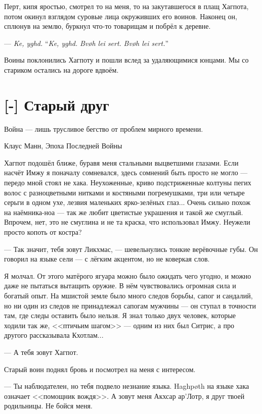 Перт, кипя яростью, смотрел то на меня, то на закутавшегося в плащ Хагпота, потом окинул взглядом суровые лица окруживших его воинов.
Наконец он, сплюнув на землю, буркнул что-то товарищам и побрёл к деревне.

{--- \textit{Ke, yghd.}}
{``\textit{Ke, yghd.}}
{\textit{Bv\o{}h lei sert.}}
{\textit{Bv\o h lei sert.}''}

Воины поклонились Хагпоту и пошли вслед за удаляющимися юнцами.
Мы со стариком остались на дороге вдвоём.

\section{[-] Старый друг}

\epigraph
{Война --- лишь трусливое бегство от проблем мирного времени.}
{Клаус Манн, Эпоха Последней Войны}

Хагпот подошёл ближе, буравя меня стальными выцветшими глазами.
Если насчёт Имжу я поначалу сомневался, здесь сомнений быть просто не могло --- передо мной стоял не хака.
Неухоженные, криво подстриженные колтуны пегих волос с разноцветными нитками и костяными погремушками, три или четыре серьги в одном ухе, лезвия маленьких ярко-зелёных глаз...
Очень сильно похож на наёмника-ноа --- так же любит цветистые украшения и такой же смуглый.
Впрочем, нет, это не смуглина и не та краска, что использовал Имжу.
Неужели просто копоть от костра?

--- Так значит, тебя зовут Ликхмас, --- шевельнулись тонкие верёвочные губы.
Он говорил на языке сели --- с лёгким акцентом, но не коверкая слов.

Я молчал.
От этого матёрого ягуара можно было ожидать чего угодно, и можно даже не пытаться вытащить оружие.
В нём чувствовались огромная сила и богатый опыт.
На мшистой земле было много следов борьбы, сапог и сандалий, но ни один из следов не принадлежал сапогам мужчины --- он ступал в точности там, где следы оставить было нельзя.
Я знал только двух человек, которые ходили так же, <<птичьим шагом>> --- одним из них был Ситрис, а про другого рассказывала Кхотлам...

--- А тебя зовут Хагпот.

Старый воин поднял бровь и посмотрел на меня с интересом.

--- Ты наблюдателен, но тебя подвело незнание языка.
Haghp\o{}th на языке хака означает <<помощник вождя>>.
А зовут меня Акхсар ар’Лотр, я друг твоей родильницы.
Не бойся меня.

